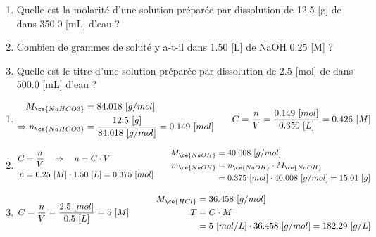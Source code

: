 \documentclass[
  11pt,
  a4paper,
  openany]{book}
\providecommand{\tightlist}{%
  \setlength{\itemsep}{0pt}\setlength{\parskip}{0pt}}
\begin{document}
\begin{Exercise}

\begin{enumerate}
\def\labelenumi{\arabic{enumi}.}
\tightlist
\item
  Quelle est la molarité d'une solution préparée par dissolution de 12.5 {[}g{]} de  dans 350.0 {[}mL{]} d'eau ?
\item
  Combien de grammes de soluté y a-t-il dans 1.50 {[}L{]} de NaOH 0.25 {[}M{]} ?
\item
  Quelle est le titre d'une solution préparée par dissolution de 2.5 {[}mol{]} de  dans 500.0 {[}mL{]} d'eau ?
\end{enumerate}

\end{Exercise}

\begin{Answer}

\begin{enumerate}
\def\labelenumi{\arabic{enumi}.}
\tightlist
\item
  \[
  \begin{split}
   M_{\ce{NaHCO3}} &= 84.018\ [g/mol] \\
   \Rightarrow n_{\ce{NaHCO3}} &= \frac{12.5\ [g]}{84.018\ [g/mol]} = 0.149\ [mol]
  \end{split}
  \qquad
  \begin{split}
   C = \frac{n}{V} = \frac{0.149\ [mol]}{0.350\ [L]} = 0.426\ [M]
  \end{split}
  \]
\item
  \[
  \begin{split}
   C &= \frac{n}{V} \quad \Rightarrow \quad n = C \cdot V\\
   n &= 0.25\ [M] \cdot 1.50\ [L] = 0.375\ [mol]
  \end{split}
  \qquad
  \begin{split}
   M_{\ce{NaOH}} &= 40.008\ [g/mol] \\
   m_{\ce{NaOH}} &= n_{\ce{NaOH}} \cdot M_{\ce{NaOH}} \\
   &= 0.375\ [mol] \cdot 40.008\ [g/mol] = 15.01\ [g]
  \end{split}
  \]
\item
  \[
  \begin{split}
   C &= \frac{n}{V} = \frac{2.5\ [mol]}{0.5\ [L]} = 5\ [M]
  \end{split}
  \qquad
  \begin{split}
   M_{\ce{HCl}} &= 36.458\ [g/mol] \\
   T &= C \cdot M \\
   &= 5\ [mol/L] \cdot 36.458\ [g/mol] = 182.29\ [g/L]
  \end{split}
  \]
\end{enumerate}

\end{Answer}
\end{document}
